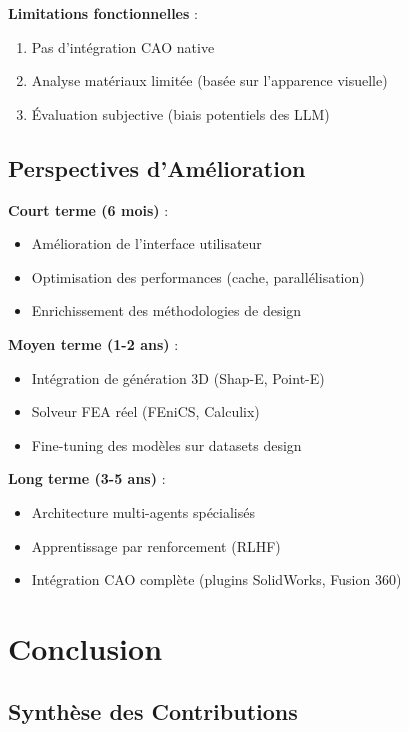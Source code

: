 \documentclass[12pt,a4paper]{article}
\begin{document}
\textbf{Limitations fonctionnelles} :
\begin{enumerate}
    \item Pas d'intégration CAO native
    \item Analyse matériaux limitée (basée sur l'apparence visuelle)
    \item Évaluation subjective (biais potentiels des LLM)
\end{enumerate}

\subsection{Perspectives d'Amélioration}

\textbf{Court terme (6 mois)} :
\begin{itemize}
    \item Amélioration de l'interface utilisateur
    \item Optimisation des performances (cache, parallélisation)
    \item Enrichissement des méthodologies de design
\end{itemize}

\textbf{Moyen terme (1-2 ans)} :
\begin{itemize}
    \item Intégration de génération 3D (Shap-E, Point-E)
    \item Solveur FEA réel (FEniCS, Calculix)
    \item Fine-tuning des modèles sur datasets design
\end{itemize}

\textbf{Long terme (3-5 ans)} :
\begin{itemize}
    \item Architecture multi-agents spécialisés
    \item Apprentissage par renforcement (RLHF)
    \item Intégration CAO complète (plugins SolidWorks, Fusion 360)
\end{itemize}

\section{Conclusion}

\subsection{Synthèse des Contributions}
\end{document}
